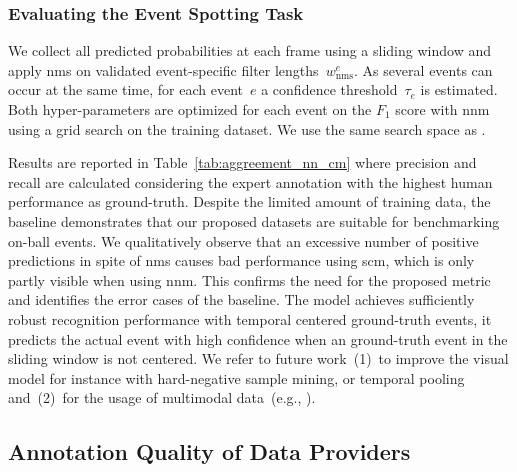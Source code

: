 \subsubsection{Evaluating the Event Spotting Task}
We collect all predicted probabilities at each frame using a sliding window and apply \acrshort{nms} on validated event-specific filter lengths~$w^e_\text{nms}$. 
As several events can occur at the same time, for each event~$e$ a confidence threshold~$\tau_e$ is estimated.
Both hyper-parameters are optimized for each event on the $F_1$ score with \acrshort{nnm} using a grid search on the training dataset. We use the same search space as \citet{sanford2020group}.

Results are reported in Table~\ref{tab:aggreement_nn_cm} where precision and recall are calculated considering the expert annotation with the highest human performance as ground-truth.
Despite the limited amount of training data, the baseline demonstrates that our proposed datasets are suitable for benchmarking on-ball events.
We qualitatively observe that an excessive number of positive predictions in spite of \acrshort{nms} causes bad performance using \acrshort{scm}, which is only partly visible when using \acrshort{nnm}. 
This confirms the need for the proposed metric and identifies the error cases of the baseline.
The model achieves sufficiently robust recognition performance with temporal centered ground-truth events, it predicts the actual event with high confidence when an ground-truth event in the sliding window is not centered.
We refer to future work~(1)~to improve the visual model for instance with hard-negative sample mining, or temporal pooling~\cite{giancola2021temporally} and~(2)~for the usage of multimodal data~(e.g., \cite{vanderplaetse2020improved}).

\subsection{Annotation Quality of Data Providers}\label{exp:data_prov_quality}

